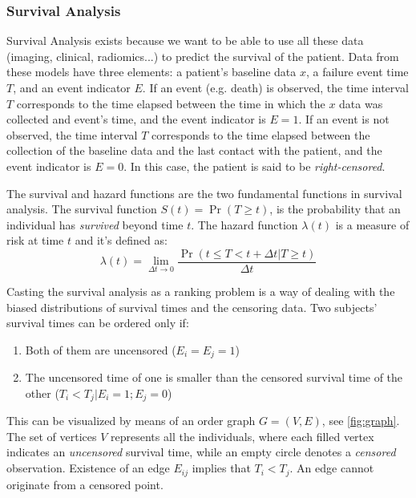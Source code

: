 \subsubsection{Survival Analysis}

Survival Analysis exists because we want to be able to use all these data (imaging, clinical,
radiomics...) to predict the survival of the patient.
Data from these models have three elements: a patient's baseline data \( x \), a failure event 
time \( T \), and an event indicator \( E \). If an event (e.g. death) is observed, the time 
interval \( T \) corresponds to the time elapsed between the time in which the \( x \)
data was collected and event's time, and the event indicator is \( E = 1 \). If an
event is not observed, the time interval \( T \) corresponds to the time elapsed between
the collection of the baseline data and the last contact with the patient, and the 
event indicator is \( E = 0 \). In this case, the patient is said to be
\emph{right-censored}.
~\cite{medical:deep-surv}

The survival and hazard functions are the two fundamental functions in survival analysis. The
survival function \( S(t) = \Pr(T \ge t) \), is the probability that an individual has
\emph{survived} beyond time \( t \). The hazard function \( \lambda(t) \) is a measure of risk at 
time \( t \) and it's defined as:
~\cite{medical:cox}
\[
  \lambda(t) = \lim_{\Delta t \rightarrow 0}
  \frac{\Pr(t \le T < t + \Delta t | T \ge t)}{\Delta t}
\]

Casting the survival analysis as a ranking problem is a way of dealing with the biased
distributions of survival times and the censoring data. Two subjects' survival times can be 
ordered only if:
\begin{enumerate}[noitemsep, topsep=0pt]
  \item Both of them are uncensored (\( E_i = E_j = 1\))
  \item The uncensored time of one is smaller than the censored survival time of the other
  (\( T_i < T_j | E_i = 1; E_j = 0 \))
\end{enumerate}

This can be visualized by means of an order graph \( G = (V, E) \), see \autoref{fig:graph}.
The set of vertices \( V \) represents all the individuals, where each filled vertex indicates
an \emph{uncensored} survival time, while an empty circle denotes a \emph{censored} observation.
Existence of an edge \( E_{ij} \) implies that \( T_i < T_j \). An edge cannot originate 
from a censored point.

